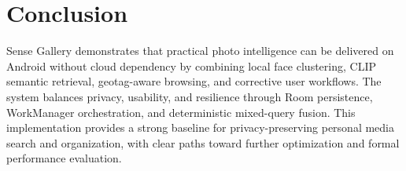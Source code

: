 \documentclass[conference]{IEEEtran}
\begin{document}
\section{Conclusion}
Sense Gallery demonstrates that practical photo intelligence can be delivered on Android without cloud dependency by combining local face clustering, CLIP semantic retrieval, geotag-aware browsing, and corrective user workflows. The system balances privacy, usability, and resilience through Room persistence, WorkManager orchestration, and deterministic mixed-query fusion. This implementation provides a strong baseline for privacy-preserving personal media search and organization, with clear paths toward further optimization and formal performance evaluation.



\end{document}
